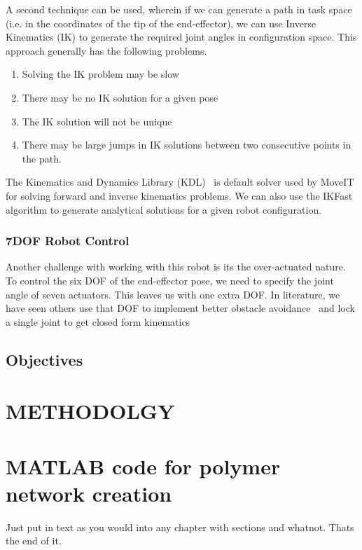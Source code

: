 \documentclass[BTech]{iitmdiss}
\begin{document}

    A second technique can be used, wherein if we can generate a path in task space (i.e. in the coordinates of the tip of the end-effector),
    we can use Inverse Kinematics (IK) to generate the required joint angles in configuration space. This approach generally has the following problems.
    \begin{enumerate}
        \item Solving the IK problem may be slow
        \item There may be no IK solution for a given pose
        \item The IK solution will not be unique
        \item There may be large jumps in IK solutions between two consecutive points in the path.
    \end{enumerate}

    The Kinematics and Dynamics Library (KDL)~\cite{kdl-url} is default solver used by MoveIT for solving forward and inverse kinematics problems.
    We can also use the IKFast algorithm to generate analytical solutions for a given robot configuration.

    \subsection{7DOF Robot Control}

    Another challenge with working with this robot is its the over-actuated nature.
    To control the six DOF of the end-effector pose, we need to specify the joint angle of seven actuators.
    This leaves us with one extra DOF.
    In literature, we have seen others use that DOF to implement better obstacle avoidance~\cite{Doliwa_2020} and lock a single joint to get closed form kinematics~\cite{Asthana}


    \section{Objectives}


    \chapter{METHODOLGY}\label{ch:introm}



    \appendix


    \chapter{MATLAB code for polymer network creation} \label{code}

    Just put in text as you would into any chapter with sections and whatnot. Thats the end of it.


    \begin{singlespace}
        
        
    \end{singlespace}
\end{document}
